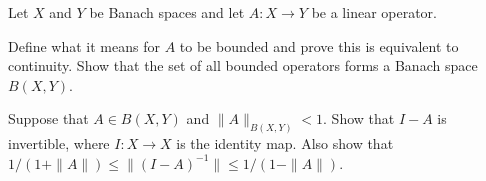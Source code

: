Let $X$ and $Y$ be Banach spaces and let $A:X\rightarrow Y$ be a
linear operator.
\begin{alist}
\item Define what it means for $A$ to be bounded and prove this is
equivalent to continuity. Show that the set of all bounded operators
forms a Banach space $B(X,Y)$.
\item Suppose that $A\in B(X,Y)$ and $\|A\|_{B(X,Y)}<1$. Show that
$I-A$ is invertible, where $I:X\rightarrow X$ is the identity
map. Also show that $1/(1+\|A\|)\leq \|(I-A)^{-1}\|\leq 1/(1-\|A\|)$.
\end{alist}
